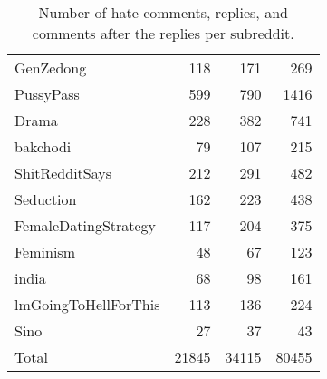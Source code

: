 \documentclass[11pt]{article}
\begin{document}
\begin{table}[ht!]
\begin{tabular}{lrrr}
\\
			GenZedong	& 118& 	171	& 269
\\
			PussyPass	& 599	& 790& 	1416
\\
			Drama& 	228	& 382& 	741
\\
			bakchodi& 	79& 	107& 	215
\\
			ShitRedditSays	& 212	& 291& 	482
\\
			Seduction	& 162	& 223& 	438
\\
			FemaleDatingStrategy& 	117	& 204& 	375
\\
			Feminism	& 48& 	67	& 123
\\
			india	& 68& 	98	& 161
\\
			lmGoingToHellForThis& 	113	& 136& 	224
\\
			Sino	& 27& 	37& 	43 \\
			\midrule
			Total & 21845	& 34115& 	80455 \\
			\bottomrule
		\end{tabular}
		\caption{Number of hate comments, replies, and comments after the replies per subreddit.}
		\label{t:subreddits}
	\end{table}
	
	
	
\end{document}
